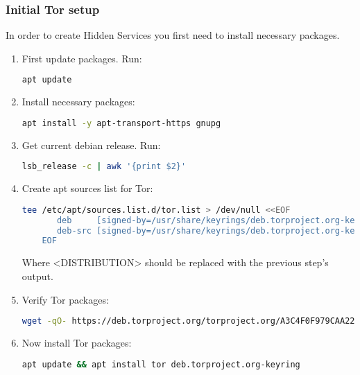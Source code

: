 \subsubsection{Initial Tor setup}
In order to create Hidden Services you first need to install necessary packages.
\begin{enumerate}
    \item First update packages. Run:
    \begin{lstlisting}[language=bash]
    apt update
    \end{lstlisting}
    \item Install necessary packages:
    \begin{lstlisting}[language=bash]
    apt install -y apt-transport-https gnupg
    \end{lstlisting}
    \item Get current debian release. Run:
    \begin{lstlisting}[language=bash]
    lsb_release -c | awk '{print $2}'
    \end{lstlisting}
    \item Create apt sources list for Tor:
    \begin{lstlisting}[language=bash, breaklines=true, breakatwhitespace=true, columns=flexible]
    tee /etc/apt/sources.list.d/tor.list > /dev/null <<EOF
       deb     [signed-by=/usr/share/keyrings/deb.torproject.org-keyring.gpg] https://deb.torproject.org/torproject.org <DISTRIBUTION> main
       deb-src [signed-by=/usr/share/keyrings/deb.torproject.org-keyring.gpg] https://deb.torproject.org/torproject.org <DISTRIBUTION> main
    EOF
    \end{lstlisting}
    Where <DISTRIBUTION> should be replaced with the previous step’s output.
    \item Verify Tor packages:
    {\footnotesize
    \begin{lstlisting}[language=bash, breaklines=true, columns=flexible]
    wget -qO- https://deb.torproject.org/torproject.org/A3C4F0F979CAA22CDBA8F512EE8CBC9E886DDD89.asc | gpg --dearmor | tee /usr/share/keyrings/deb.torproject.org-keyring.gpg >/dev/null
    \end{lstlisting}
    }
    \item Now install Tor packages:
    \begin{lstlisting}[language=bash]
    apt update && apt install tor deb.torproject.org-keyring
    \end{lstlisting}
\end{enumerate}


